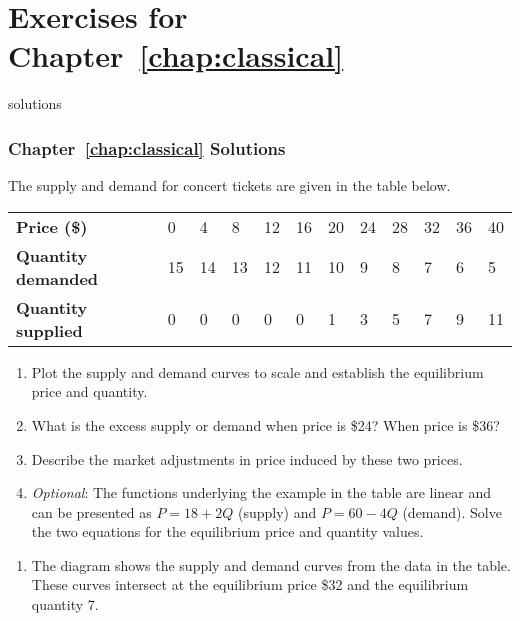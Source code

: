 \newpage
\section*{Exercises for Chapter~\ref{chap:classical}}

\begin{Filesave}{solutions}
\subsubsection*{Chapter~\ref{chap:classical} Solutions}
\end{Filesave}

\begin{enumialphparenastyle}

\begin{econex}\label{ex:ch3ex1}
The supply and demand for concert tickets are given in the table below.
\begin{Table}{}
\begin{tabu} to \linewidth {|X[7,l]X[1,l]X[1,l]X[1,l]X[1,l]X[1,l]X[1,l]X[1,l]X[1,l]X[1,l]X[1,l]X[1,l]|}	\hline
{}	\textbf{Price (\$)} & 0 & 4 & 8 & 12 & 16 & 20 & 24 & 28 & 32 & 36 & 40 \\ 
						\textbf{Quantity demanded} & 15 & 14 & 13 & 12 & 11 & 10 & 9 & 8 & 7 & 6 & 5 \\ 
	\textbf{Quantity supplied} & 0 & 0 & 0 & 0 & 0 & 1 & 3 & 5 & 7 & 9 & 11	\\	\hline
\end{tabu}
\end{Table}
\begin{enumerate}
	\item	Plot the supply and demand curves to scale and establish the equilibrium price and quantity.
	\item	What is the excess supply or demand when price is \$24? When price is \$36?
	\item	Describe the market adjustments in price induced by these two prices.
	\item	\textit{Optional}: The functions underlying the example in the table are linear and can be presented as $P=18+2Q$ (supply) and $P=60-4Q$ (demand). Solve the two equations for the equilibrium price and quantity values.
\end{enumerate}
\begin{econsolution}
	\begin{enumerate}
		\item	The diagram shows the supply and demand curves from the data in the table. These curves intersect at the equilibrium price \$32 and the equilibrium quantity 7.

\end{enumerate}
\end{econsolution}
\end{econex}
\end{enumialphparenastyle}
